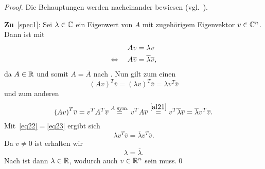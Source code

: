 \begin{proof}
    Die Behauptungen werden nacheinander bewiesen (vgl.~\cite{proof:SpectralTom}).

    \vspace{5pt}
    \textbf{Zu}~\ref{spec1}: Sei \(\lambda \in \mathbb{C}\) ein Eigenwert von \(A\) mit zugehörigem Eigenvektor \(v \in \mathbb{C}^{n}\). 
    Dann ist mit 
    \begin{align}
        Av &=\lambda v \notag \label{al21}\\
        \Leftrightarrow \quad A\overline{v} &= \overline{\lambda}\overline{v},
    \end{align}
    da \(A \in \mathbb{R}\) und somit \(A=\overline{A}\) nach . 
    Nun gilt zum einen
    \begin{equation}
        {\left(Av\right)}^T \overline{v} = {\left(\lambda v\right)}^{T} \overline{v} = \lambda {v}^{T} \overline{v} \label{eq22}
    \end{equation}
    und zum anderen
    \begin{equation}
        {\left(Av\right)}^T \overline{v} = v^{T}A^{T}\overline{v} \overset{A\text{ sym.}}{=} v^{T}A\overline{v} \overset{\eqref{al21}}{=} v^{T}\overline{\lambda}\overline{v} = \overline{\lambda}v^{T}\overline{v}. \label{eq23}
    \end{equation}
    Mit~\eqref{eq22}\(=\)\eqref{eq23} ergibt sich
    \begin{equation*}
        \lambda v^{T}\overline{v} = \overline{\lambda}v^{T}\overline{v} .
    \end{equation*}
    Da \(v \neq 0\) ist erhalten wir
    \begin{equation*}
        \lambda = \overline{\lambda}.
    \end{equation*}
    Nach  ist dann \(\lambda \in \mathbb{R}\), wodurch auch \(v \in \mathbb{R}^{n}\) sein muss.\qed
    \vspace{5pt} 


\end{proof}
